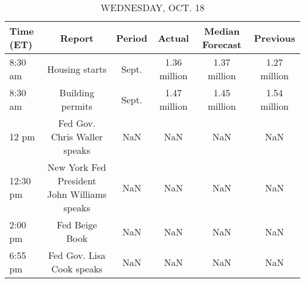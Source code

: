 \documentclass{article}%
\begin{document}
%


\begin{table}[htbp]%
\caption{WEDNESDAY, OCT. 18}%
\centering%
\begin{adjustbox}{width=1\textwidth}%
\begin{tabular}{lccccc}
\toprule
Time (ET) &                                      Report & Period &       Actual & Median Forecast &     Previous \\
\midrule
  8:30 am &                              Housing starts &  Sept. & 1.36 million &    1.37 million & 1.27 million \\
  8:30 am &                            Building permits &  Sept. & 1.47 million &    1.45 million & 1.54 million \\
    12 pm &                Fed Gov. Chris Waller speaks &    NaN &          NaN &             NaN &          NaN \\
 12:30 pm & New York Fed President John Williams speaks &    NaN &          NaN &             NaN &          NaN \\
  2:00 pm &                              Fed Beige Book &    NaN &          NaN &             NaN &          NaN \\
  6:55 pm &                   Fed Gov. Lisa Cook speaks &    NaN &          NaN &             NaN &          NaN \\
\bottomrule
\end{tabular}
%
\end{adjustbox}%
\end{table}

%
\end{document}
